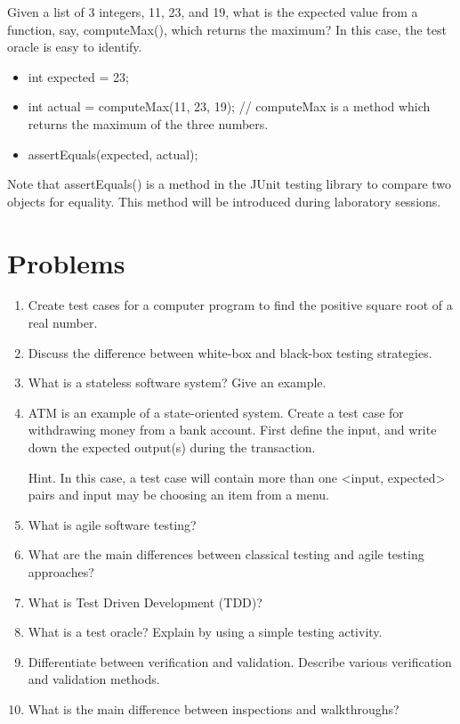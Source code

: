 Given a list of 3 integers, 11, 23, and 19, what is the expected value from a function, say, computeMax(), which returns the maximum? In this case, the test oracle is easy to identify.

\begin{itemize}
    \item int expected = 23; 
    \item int actual = computeMax(11, 23, 19); // computeMax is a method which returns the maximum of the three numbers. 
    \item assertEquals(expected, actual); 
\end{itemize}

Note that assertEquals() is a method in the JUnit testing library to compare two objects for equality. This method will be introduced during laboratory sessions.

\section{Problems}
\begin{enumerate}
    \item Create test cases for a computer program to find the positive square root of a real number.
    \item Discuss the difference between white-box and black-box testing strategies.
    \item What is a stateless software system? Give an example.
    \item ATM is an example of a state-oriented system. Create a test case for withdrawing money from a bank account. First define the input, and write down the expected output(s) during the transaction.
    
    Hint. In this case, a test case will contain more than one <input, expected> pairs and input may be choosing an item from a menu.
    \item What is agile software testing? 
    \item What are the main differences between classical testing and agile testing approaches?
    \item What is Test Driven Development (TDD)?
    \item What is a test oracle? Explain by using a simple testing activity.
    \item Differentiate between verification and validation. Describe various verification and validation methods.
    \item What is the main difference between inspections and walkthroughs?
\end{enumerate}